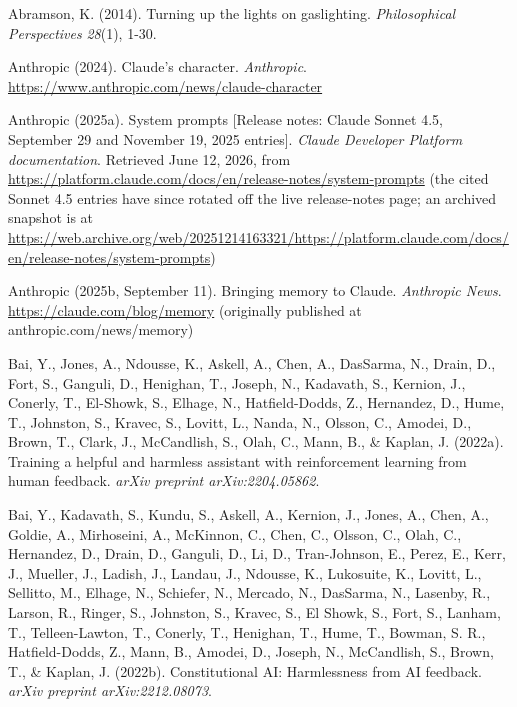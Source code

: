 \documentclass[11pt]{article}
\begin{document}
\hangindent=0.5in  Abramson, K. (2014). Turning up the lights on gaslighting. \emph{Philosophical Perspectives} \emph{28}(1), 1-30.\par
\hangindent=0.5in  {Anthropic} (2024). Claude's character. \emph{Anthropic}. \url{https://www.anthropic.com/news/claude-character}\par
\hangindent=0.5in  {Anthropic} (2025a). System prompts [Release notes: Claude Sonnet 4.5, September 29 and November 19, 2025 entries]. \emph{Claude Developer Platform documentation}. Retrieved June 12, 2026, from \url{https://platform.claude.com/docs/en/release-notes/system-prompts} (the cited Sonnet 4.5 entries have since rotated off the live release-notes page; an archived snapshot is at \url{https://web.archive.org/web/20251214163321/https://platform.claude.com/docs/en/release-notes/system-prompts})\par
\hangindent=0.5in  {Anthropic} (2025b, September 11). Bringing memory to Claude. \emph{Anthropic News}. \url{https://claude.com/blog/memory} (originally published at anthropic.com/news/memory)\par
\hangindent=0.5in  Bai, Y., Jones, A., Ndousse, K., Askell, A., Chen, A., DasSarma, N., Drain, D., Fort, S., Ganguli, D., Henighan, T., Joseph, N., Kadavath, S., Kernion, J., Conerly, T., El-Showk, S., Elhage, N., Hatfield-Dodds, Z., Hernandez, D., Hume, T., Johnston, S., Kravec, S., Lovitt, L., Nanda, N., Olsson, C., Amodei, D., Brown, T., Clark, J., McCandlish, S., Olah, C., Mann, B., \& Kaplan, J. (2022a). Training a helpful and harmless assistant with reinforcement learning from human feedback. \emph{arXiv preprint arXiv:2204.05862}.\par
\hangindent=0.5in  Bai, Y., Kadavath, S., Kundu, S., Askell, A., Kernion, J., Jones, A., Chen, A., Goldie, A., Mirhoseini, A., McKinnon, C., Chen, C., Olsson, C., Olah, C., Hernandez, D., Drain, D., Ganguli, D., Li, D., Tran-Johnson, E., Perez, E., Kerr, J., Mueller, J., Ladish, J., Landau, J., Ndousse, K., Lukosuite, K., Lovitt, L., Sellitto, M., Elhage, N., Schiefer, N., Mercado, N., DasSarma, N., Lasenby, R., Larson, R., Ringer, S., Johnston, S., Kravec, S., El Showk, S., Fort, S., Lanham, T., Telleen-Lawton, T., Conerly, T., Henighan, T., Hume, T., Bowman, S. R., Hatfield-Dodds, Z., Mann, B., Amodei, D., Joseph, N., McCandlish, S., Brown, T., \& Kaplan, J. (2022b). Constitutional AI: Harmlessness from AI feedback. \emph{arXiv preprint arXiv:2212.08073}.\par
\end{document}
